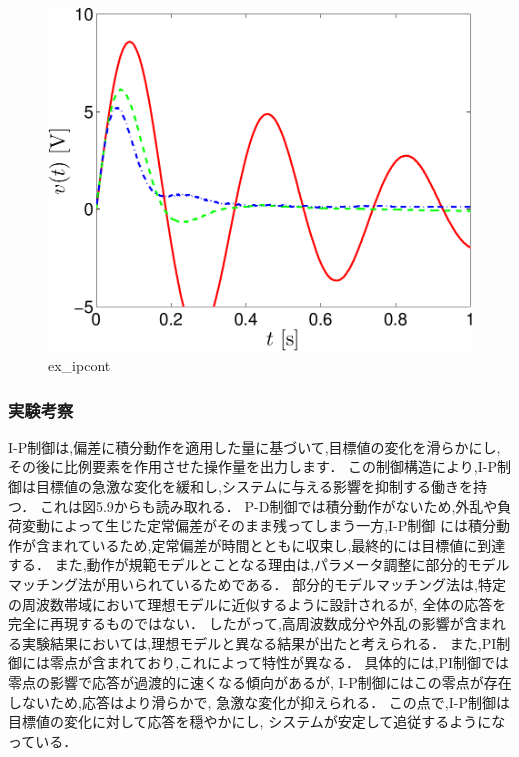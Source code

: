 \begin{figure}[h]
  \centering
  \includegraphics[scale=0.5]{sozai/figure_ipcont_volt-crop.pdf}
  \caption{ex\_ipcont}
\end{figure}

\newpage

\subsubsection{実験考察}
I-P制御は,偏差に積分動作を適用した量に基づいて,目標値の変化を滑らかにし,
その後に比例要素を作用させた操作量を出力します．
この制御構造により,I-P制御は目標値の急激な変化を緩和し,システムに与える影響を抑制する働きを持つ．
これは図5.9からも読み取れる．
P-D制御では積分動作がないため,外乱や負荷変動によって生じた定常偏差がそのまま残ってしまう一方,I-P制御
には積分動作が含まれているため,定常偏差が時間とともに収束し,最終的には目標値に到達する．
また,動作が規範モデルとことなる理由は,パラメータ調整に部分的モデルマッチング法が用いられているためである．
部分的モデルマッチング法は,特定の周波数帯域において理想モデルに近似するように設計されるが,
全体の応答を完全に再現するものではない．
したがって,高周波数成分や外乱の影響が含まれる実験結果においては,理想モデルと異なる結果が出たと考えられる．
また,PI制御には零点が含まれており,これによって特性が異なる．
具体的には,PI制御では零点の影響で応答が過渡的に速くなる傾向があるが,
I-P制御にはこの零点が存在しないため,応答はより滑らかで,
急激な変化が抑えられる．
この点で,I-P制御は目標値の変化に対して応答を穏やかにし,
システムが安定して追従するようになっている．



